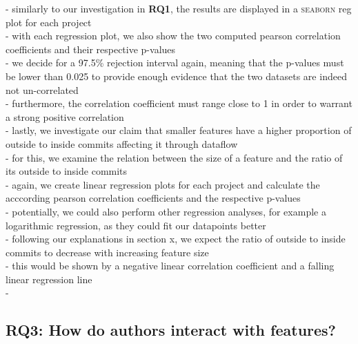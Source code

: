 - similarly to our investigation in \textbf{RQ1}, the results are displayed in a \textsc{seaborn} reg plot for each project \\
- with each regression plot, we also show the two computed pearson correlation coefficients and their respective p-values \\
- we decide for a 97.5\% rejection interval again, meaning that the p-values must be lower than 0.025 to provide enough evidence that the two datasets are indeed not un-correlated \\
- furthermore, the correlation coefficient must range close to 1 in order to warrant a strong positive correlation \\
- lastly, we investigate our claim that smaller features have a higher proportion of outside to inside commits affecting it through dataflow \\
- for this, we examine the relation between the size of a feature and the ratio of its outside to inside commits \\
- again, we create linear regression plots for each project and calculate the acccording pearson correlation coefficients and the respective p-values \\
- potentially, we could also perform other regression analyses, for example a logarithmic regression, as they could fit our datapoints better \\
- following our explanations in section x, we expect the ratio of outside to inside commits to decrease with increasing feature size \\
- this would be shown by a negative linear correlation coefficient and a falling linear regression line \\
-

\subsection*{\textbf{RQ3: How do authors interact with features?}}

